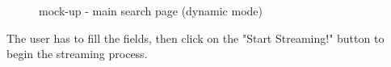\documentclass[a4paper,11pt]{report}
\begin{document}
\begin{figure}[H]
\begin{center}
\caption{mock-up - main search page (dynamic mode)}
\end{center}
\end{figure}
\vspace*{\fill}
\newpage
\vspace*{\fill}
The user has to fill the fields, then click on the "Start Streaming!" button to begin the streaming process.
\bigskip
\end{document}
